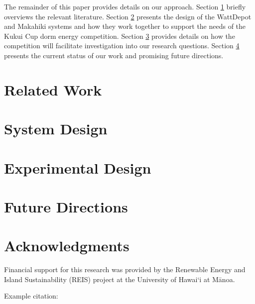 \documentclass[conference,compsoc,peerreview]{IEEEtran}
\begin{document}
The remainder of this paper provides details on our approach.  Section
\ref{sec:related-work} briefly overviews the relevant literature.  Section
\ref{sec:system-design} presents the design of the WattDepot and Makahiki
systems and how they work together to support the needs of the Kukui Cup
dorm energy competition.  Section \ref{sec:experimental-design} provides details
on how the competition will facilitate investigation into our research questions. 
Section \ref{sec:future-directions} presents the current status of our work and promising future
directions. 

\section{Related Work}
\label{sec:related-work}

\section{System Design}
\label{sec:system-design}

\section{Experimental Design}
\label{sec:experimental-design}

\section{Future Directions}
\label{sec:future-directions}

\section{Acknowledgments}

Financial support for this research was provided by the Renewable Energy and
Island Sustainability (REIS) project at the University of Hawai`i at M\=anoa.

Example citation: \cite{GooglePowerMeter}



\end{document}
